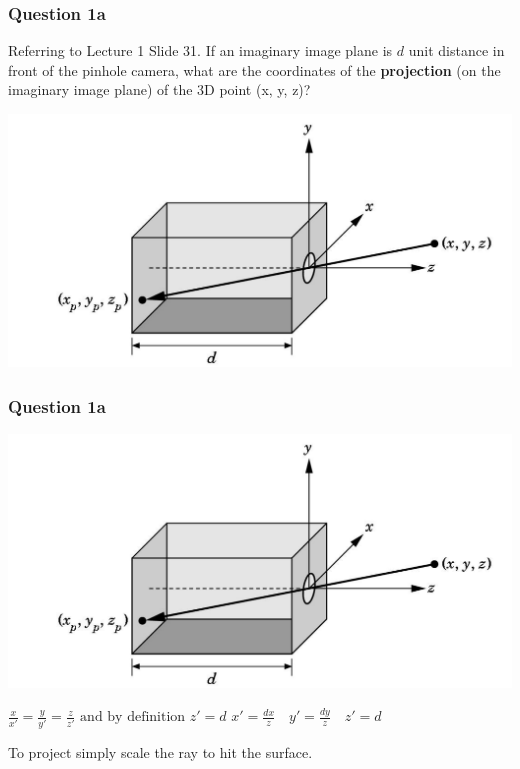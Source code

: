 \documentclass{beamer}
\begin{document}
\begin{frame}
    \frametitle{Question 1a}
    Referring to Lecture 1 Slide 31. If an imaginary image plane is $d$ unit distance in front of the pinhole camera, 
    what are the coordinates of the \textbf{projection} (on the imaginary image plane) of the 3D point (x, y, z)? 

    \vspace{1em}

    \begin{center}
        \includegraphics[scale=0.5]{q1-pinhole.png}
    \end{center}
\end{frame}

\begin{frame}
    \frametitle{Question 1a}

    \begin{center}
        \includegraphics[scale=0.4]{q1-pinhole.png}
    \end{center}
    
    \vspace{1em}

    \begin{tcolorbox}
        \centering
        $\frac{x}{x'} = \frac{y}{y'} = \frac{z}{z'} \text{ and by definition } z' = d$
        $ x' = \frac{dx}{z} \quad y' = \frac{dy}{z} \quad z' = d$
    \end{tcolorbox}

    To project simply scale the ray to hit the surface.

\end{frame}
\end{document}
